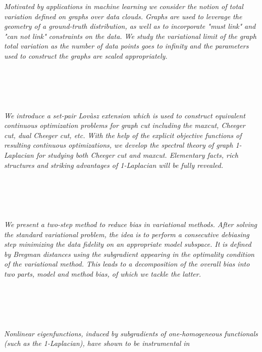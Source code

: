   \begin{multicols}{2}
      \textit{Motivated by applications in machine learning we consider the notion of total variation defined on graphs over  data clouds. Graphs are used to leverage the geometry of a ground-truth distribution, as well as to incorporate "must link" and "can not link" constraints on the data. We study the variational limit of the graph total variation as the number of data points goes to infinity and the parameters used to construct the graphs are scaled appropriately.}\\
\\ 
        \\
        \\\\
\\
      \textit{We introduce a set-pair Lovàsz extension which is used to construct equivalent continuous optimization problems for graph cut including the maxcut, Cheeger cut, dual Cheeger cut, etc. With the help of the explicit objective functions of resulting continuous optimizations, we develop the spectral theory of graph 1-Laplacian for studying both Cheeger cut and maxcut. Elementary facts, rich structures and striking advantages of 1-Laplacian will be fully revealed.}\\
\\ 
        \\
        \\\\
\\
      \textit{We present a two-step method to reduce bias in variational methods. After solving the standard variational problem, the idea is to perform a consecutive debiasing step minimizing the data fidelity on an appropriate model subspace. It is defined by Bregman distances using the subgradient appearing in the optimality condition of the variational method. This leads to a decomposition of the overall bias into two parts, model and method bias, of which we tackle the latter.}\\
\\ 
        \\
        \\\\
\\
      \textit{Nonlinear eigenfunctions, induced by subgradients of one-homogeneous
functionals (such as the 1-Laplacian), have shown to be instrumental in
}
\end{multicols}
